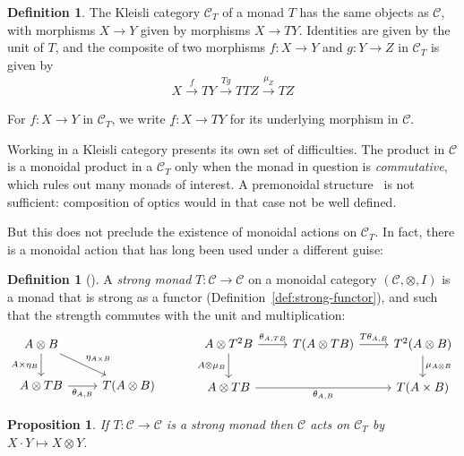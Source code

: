 \documentclass[11pt,a4paper]{article}
\theoremstyle{plain}
\newtheorem{proposition}[theorem]{Proposition}
\theoremstyle{definition}
\newtheorem{definition}[theorem]{Definition}
\newcommand{\C}{\mathscr{C}}
\begin{document}
\begin{definition}
The Kleisli category $\C_T$ of a monad $T$ has the same objects as $\C$, with morphisms $X \to Y$ given by morphisms $X \to TY$. Identities are given by the unit of $T$, and the composite of two morphisms $f : X \to Y$ and $g : Y \to Z$ in $\C_T$ is given by
\begin{align*}
X \xrightarrow{f} TY \xrightarrow{Tg} TTZ \xrightarrow{\mu_Z} TZ
\end{align*}

For $f : X \to Y$ in $\C_T$, we write $\underline{f} : X \to TY$ for its underlying morphism in $\C$.
\end{definition}

Working in a Kleisli category presents its own set of difficulties. The product in $\C$ is a monoidal product in a $\C_T$ only when the monad in question is \emph{commutative}, which rules out many monads of interest. A premonoidal structure~\cite{PremonoidalCategories} is not sufficient: composition of optics would in that case not be well defined.

But this does not preclude the existence of monoidal actions on $\C_T$. In fact, there is a monoidal action that has long been used under a different guise:

\begin{definition}[{\cite{NotionsOfComputationAndMonads}}]
A \emph{strong monad} $T : \C \to \C$ on a monoidal category $(\C, \otimes, I)$ is a monad that is strong as a functor (Definition~\ref{def:strong-functor}), and such that the strength commutes with the unit and multiplication: 
\[
  \begin{tikzcd}
    A \otimes B \ar[d, swap, "A \times \eta_B"] \ar[dr, "\eta_{A \times B}"] & \\
    A \otimes TB \ar[r, swap, "\theta_{A, B}"] & T(A \otimes B) 
  \end{tikzcd} \hspace{1cm}
  \begin{tikzcd}
    A \otimes T^2 B \ar[r, "\theta_{A, TB}"] \ar[d, swap, "A \otimes \mu_B"] & T(A \otimes TB) \ar[r, "T\theta_{A, B}"] & T^2(A \otimes B) \ar[d, "\mu_{A \otimes B}"] \\
    A \otimes TB \ar[rr, swap, "\theta_{A, B}"] & & T(A \times B)
  \end{tikzcd}
\]
\end{definition}

\begin{proposition}
If $T : \C \to \C$ is a strong monad then $\C$ acts on $\C_T$ by $X \cdot Y \mapsto X \otimes Y$.
\end{proposition}
\end{document}
